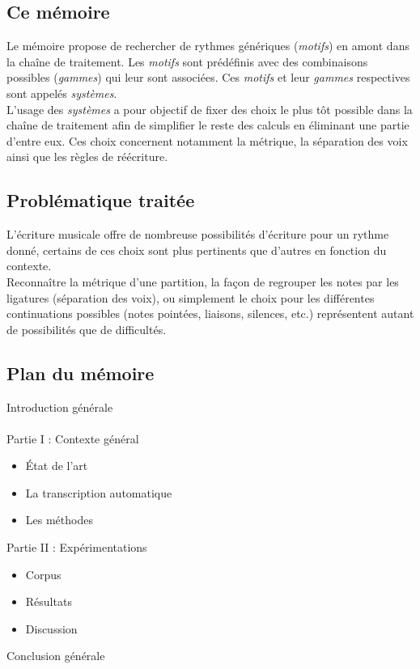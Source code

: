 \subsection*{Ce mémoire}
Le mémoire propose de rechercher de rythmes génériques (\textit{motifs}) en amont dans la chaîne de traitement. Les \textit{motifs} sont prédéfinis avec des combinaisons possibles (\textit{gammes}) qui leur sont associées. Ces \textit{motifs} et leur \textit{gammes} respectives sont appelés \textit{systèmes}.\\L’usage des \textit{systèmes} a pour objectif de fixer des choix le plus tôt possible dans la chaîne de traitement afin de simplifier le reste des calculs en éliminant une partie d’entre eux. Ces choix concernent notamment la métrique, la séparation des voix ainsi que les règles de réécriture.
\subsection*{Problématique traitée}	
	L’écriture musicale offre de nombreuse possibilités d’écriture pour un rythme donné, certains de ces choix sont plus pertinents que d’autres en fonction du contexte.\\
	Reconnaître la métrique d’une partition, la façon de regrouper les notes par les ligatures (séparation des voix), ou simplement le choix pour les différentes continuations possibles (notes pointées, liaisons, silences, etc.) représentent autant de possibilités que de difficultés.
\subsection*{Plan du mémoire}


Introduction générale\\\\
Partie I : Contexte général
\begin{itemize}
	\item État de l’art
	\item La transcription automatique
	\item Les méthodes\\
\end{itemize}
Partie II : Expérimentations
\begin{itemize}
	\item Corpus
	\item Résultats
	\item Discussion\\
\end{itemize}
Conclusion générale\\